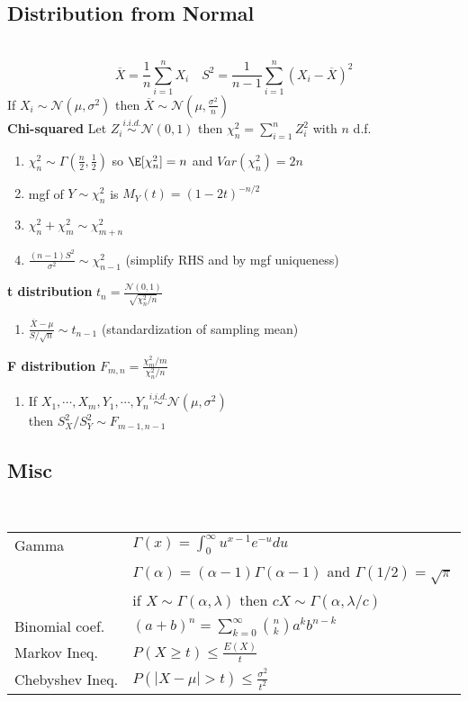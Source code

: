 \documentclass[8pt]{article}
\begin{document}
\begin{multicols}{3}
{  \subsection*{Distribution from Normal}\\
  \[
    \overline{X} = \frac{1}{n}\sum_{i=1}^n X_i \quad S^2 = \frac{1}{n-1}\sum_{i=1}^n (X_i - \overline{X})^2
  \]
  If $X_i \sim \mathcal{N}(\mu, \sigma^2)$ then $\overline{X} \sim \mathcal{N}(\mu, \frac{\sigma^2}{n})$\\
  \textbf{Chi-squared} Let $Z_i \stackrel{i.i.d.}{\sim} \mathcal{N}(0,1)$ then $\chi_n^2 = \sum_{i=1}^n Z_i^2$ with $n$ d.f.
  \begin{enumerate}
    \item $\chi_n^2 \sim \Gamma(\frac{n}{2}, \frac{1}{2})$ so $\E[\chi_n^2] = n$ and $Var(\chi_n^2) = 2n$
    \item mgf of $Y\sim \chi_n^2$ is $M_Y(t)= (1-2t)^{-n/2}$
    \item $\chi_n^2 + \chi_m^2 \sim \chi^2_{m+n}$
    \item $\frac{(n-1)S^2}{\sigma^2} \sim \chi_{n-1}^2$ (simplify RHS and by mgf uniqueness)
  \end{enumerate}
  \textbf{t distribution} $t_{n} = \frac{\mathcal{N}(0,1)}{\sqrt{\chi_n^2 / n}}$\\
  \begin{enumerate}
    \item $\frac{\overline{X} - \mu}{S / \sqrt{n}} \sim t_{n-1}$ (standardization of sampling mean)
  \end{enumerate}
  \textbf{F distribution} $F_{m,n} = \frac{\chi_m^2 / m}{\chi_n^2 / n}$\\
  \begin{enumerate}
    \item If $X_1,\cdots, X_m, Y_1,\cdots,Y_n \stackrel{i.i.d.}{\sim} \mathcal{N}(\mu, \sigma^2)$ \\then $S^2_X / S^2_Y \sim F_{m-1,n-1}$\\
  \end{enumerate}

  \subsection*{Misc}\\
  \begin{tabular}{l l}
    Gamma & $\Gamma(x) = \int_0^{\infty} u^{x-1}e^{-u}du$ \\
    & $\Gamma(\alpha) = (\alpha -1)\Gamma(\alpha-1)$ and $\Gamma(1/2) = \sqrt{\pi}$\\
    & if $X\sim \Gamma(\alpha, \lambda)$ then $cX \sim \Gamma(\alpha, \lambda / c)$ \\
    Binomial coef. & $(a+b)^n = \sum_{k=0}^{\infty} \binom{n}{k}a^kb^{n-k}$\\
    Markov Ineq. & $P(X\geq t) \leq \frac{E(X)}{t}$\\
    Chebyshev Ineq. & $P(|X-\mu|>t) \leq \frac{\sigma^2}{t^2}$\\
  \end{tabular}

}
\end{multicols}
\end{document}
